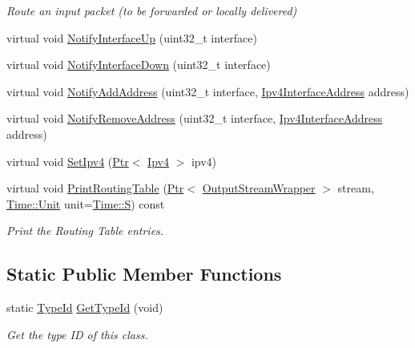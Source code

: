 \begin{DoxyCompactItemize}
\begin{DoxyCompactList}\small\item\em Route an input packet (to be forwarded or locally delivered) \end{DoxyCompactList}\item 
virtual void \hyperlink{classns3_1_1Ipv4ListRouting_a1718f9765a1372522bb8487a2ced8bf2}{Notify\+Interface\+Up} (uint32\+\_\+t interface)
\item 
virtual void \hyperlink{classns3_1_1Ipv4ListRouting_a2a895f865474c84afb327470363cdd17}{Notify\+Interface\+Down} (uint32\+\_\+t interface)
\item 
virtual void \hyperlink{classns3_1_1Ipv4ListRouting_a837e028385bc3b7caa02e5d4a1da10dc}{Notify\+Add\+Address} (uint32\+\_\+t interface, \hyperlink{classns3_1_1Ipv4InterfaceAddress}{Ipv4\+Interface\+Address} address)
\item 
virtual void \hyperlink{classns3_1_1Ipv4ListRouting_a1556c07b879adade3ecc65a4026de49e}{Notify\+Remove\+Address} (uint32\+\_\+t interface, \hyperlink{classns3_1_1Ipv4InterfaceAddress}{Ipv4\+Interface\+Address} address)
\item 
virtual void \hyperlink{classns3_1_1Ipv4ListRouting_a62155135e9c49583a9e71f3ad503e6b2}{Set\+Ipv4} (\hyperlink{classns3_1_1Ptr}{Ptr}$<$ \hyperlink{classns3_1_1Ipv4}{Ipv4} $>$ ipv4)
\item 
virtual void \hyperlink{classns3_1_1Ipv4ListRouting_afa8bf21c4f227a241a1db4a619b742fc}{Print\+Routing\+Table} (\hyperlink{classns3_1_1Ptr}{Ptr}$<$ \hyperlink{classns3_1_1OutputStreamWrapper}{Output\+Stream\+Wrapper} $>$ stream, \hyperlink{classns3_1_1Time_a87a7f4d29c68b047a72d291ad660295a}{Time\+::\+Unit} unit=\hyperlink{classns3_1_1Time_a87a7f4d29c68b047a72d291ad660295aade8622b06524a328cd3a59db6ccf76af}{Time\+::S}) const 
\begin{DoxyCompactList}\small\item\em Print the Routing Table entries. \end{DoxyCompactList}\end{DoxyCompactItemize}
\subsection*{Static Public Member Functions}
\begin{DoxyCompactItemize}
\item 
static \hyperlink{classns3_1_1TypeId}{Type\+Id} \hyperlink{classns3_1_1Ipv4ListRouting_ab144e93a79312b4122207a6b623012f1}{Get\+Type\+Id} (void)
\begin{DoxyCompactList}\small\item\em Get the type ID of this class. \end{DoxyCompactList}\end{DoxyCompactItemize}
